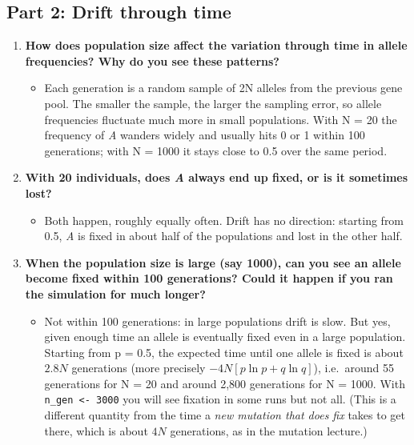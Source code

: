 \documentclass[
  a4paper]{book}
\providecommand{\tightlist}{%
  \setlength{\itemsep}{0pt}\setlength{\parskip}{0pt}}
\begin{document}
\subsection{Part 2: Drift through time}\label{part-2-drift-through-time}

\begin{enumerate}
\def\labelenumi{\arabic{enumi}.}
\tightlist
\item
  \textbf{How does population size affect the variation through time in allele frequencies? Why do you see these patterns?}

  \begin{itemize}
  \tightlist
  \item
    Each generation is a random sample of 2N alleles from the previous gene pool. The smaller the sample, the larger the sampling error, so allele frequencies fluctuate much more in small populations. With N = 20 the frequency of \emph{A} wanders widely and usually hits 0 or 1 within 100 generations; with N = 1000 it stays close to 0.5 over the same period.
  \end{itemize}
\item
  \textbf{With 20 individuals, does \emph{A} always end up fixed, or is it sometimes lost?}

  \begin{itemize}
  \tightlist
  \item
    Both happen, roughly equally often. Drift has no direction: starting from 0.5, \emph{A} is fixed in about half of the populations and lost in the other half.
  \end{itemize}
\item
  \textbf{When the population size is large (say 1000), can you see an allele become fixed within 100 generations? Could it happen if you ran the simulation for much longer?}

  \begin{itemize}
  \tightlist
  \item
    Not within 100 generations: in large populations drift is slow. But yes, given enough time an allele is eventually fixed even in a large population. Starting from p = 0.5, the expected time until one allele is fixed is about \(2.8N\) generations (more precisely \(-4N[p \ln p + q \ln q]\)), i.e.~around 55 generations for N = 20 and around 2,800 generations for N = 1000. With \texttt{n\_gen\ \textless{}-\ 3000} you will see fixation in some runs but not all. (This is a different quantity from the time a \emph{new mutation that does fix} takes to get there, which is about \(4N\) generations, as in the mutation lecture.)
  \end{itemize}
\end{enumerate}
\end{document}
